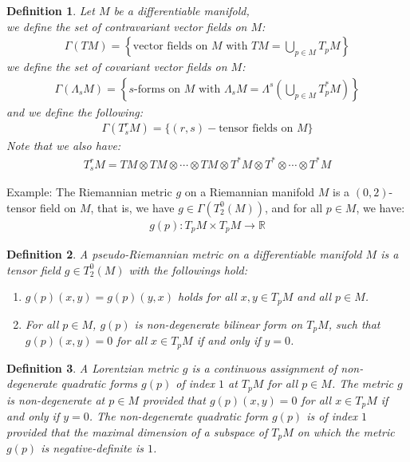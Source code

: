 \documentclass[11pt]{book}
\theoremstyle{break}
\theoremstyle{break}
\newtheorem{defn}{Definition}[corL]
\newcommand{\R}{\mathbb{R}}
\newcommand{\example}{\color{green}Example: \color{black}}
\begin{document}
\begin{defn}
Let $M$ be a differentiable manifold, \\
we define the set of contravariant vector fields on $M$:
\begin{align*}
\Gamma(TM) = \left\{ \text{vector fields on $M$ with }TM = \bigcup_{p \in M}T_pM\right\}
\end{align*}
we define the set of covariant vector fields on $M$:
\begin{align*}
\Gamma(\Lambda_s M) = \left\{s\text{-forms on $M$ with }\Lambda_sM  = \Lambda^s\left( \bigcup_{p \in M}T_p^*M\right)\right\}
\end{align*}
and we define the following:
\begin{align*}
\Gamma (T_s^rM) = \{(r,s) - \text{tensor fields on }M\}
\end{align*}
Note that we also have:
\begin{align*}
T_s^rM = TM\otimes TM\otimes \cdots \otimes TM \otimes T^*M \otimes T^*\otimes \cdots \otimes T^*M
\end{align*}
\end{defn}

\example The Riemannian metric $g$ on a Riemannian manifold $M$ is a $(0,2)$-tensor field on $M$, that is, we have $g \in \Gamma(T_2^0(M))$, and for all $p \in M$, we have:
\begin{align*}
g(p):T_pM \times T_pM \to \R
\end{align*}


\begin{defn}
A pseudo-Riemannian metric on a differentiable manifold $M$ is a tensor field $g \in T_2^0(M)$ with the followings hold:
\begin{enumerate}[topsep=3pt,itemsep=-1ex,partopsep=1ex,parsep=1ex]
\item $g(p)(x,y) = g(p)(y,x)$ holds for all $x,y \in T_pM$ and all $p \in M$.
\item For all $p \in M$, $g(p)$ is non-degenerate bilinear form on $T_pM$, such that $g(p)(x,y) =0$ for all $x \in T_pM$ if and only if $y = 0$. 
\end{enumerate}
\end{defn}


\begin{defn}
A Lorentzian metric $g$ is a continuous assignment of non-degenerate quadratic forms $g(p)$ of index $1$ at $T_pM$ for all $p \in M$. The metric $g$ is non-degenerate at $p \in M$ provided that $g(p)(x,y) = 0$ for all $x \in T_pM$ if and only if $y = 0$. The non-degenerate quadratic form $g(p)$ is of index $1$ provided that the maximal dimension of a subspace of $T_pM$ on which the metric $g(p)$ is negative-definite is $1$. 
\end{defn}
\end{document}
